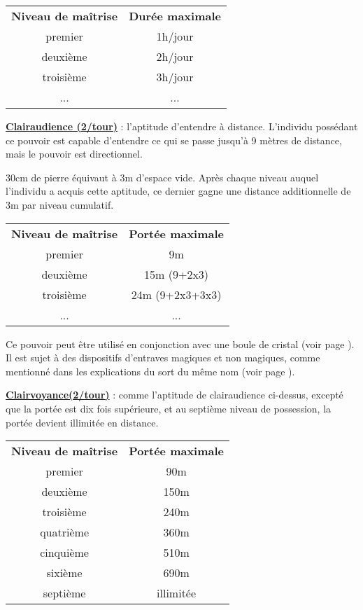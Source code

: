 \bigskip

\begin{tabular}{cc}
\textbf{Niveau de maîtrise} & \textbf{Durée maximale} \\
premier     & 1h/jour \\
deuxième    & 2h/jour \\
troisième   & 3h/jour \\
...         & ... \\
\end{tabular}

\bigskip

\label{guerrier-clairaudience}\textbf{\uline{Clairaudience (2/tour)}} : l'aptitude d'entendre à distance. L'individu possédant ce pouvoir est capable d'entendre ce qui se passe jusqu'à 9 mètres de distance, mais le pouvoir est directionnel.

\bigskip

30cm de pierre équivaut à 3m d'espace vide. Après chaque niveau auquel l'individu a acquis cette aptitude, ce dernier gagne une distance additionnelle de 3m par niveau cumulatif.

\bigskip

\begin{tabular}{cc}
\textbf{Niveau de maîtrise} & \textbf{Portée maximale} \\
premier     & 9m \\
deuxième    & 15m (9+2x3) \\
troisième   & 24m (9+2x3+3x3) \\
...         & ... \\
\end{tabular}

\bigskip

Ce pouvoir peut être utilisé en conjonction avec une boule de cristal (voir page \pageref{objet-boule-cristal}). Il est sujet à des dispositifs d'entraves magiques et non magiques, comme mentionné dans les explications du sort du même nom (voir page \pageref{sort-clairaudience}).

\newpage

\label{guerrier-clairvoyance}\textbf{\uline{Clairvoyance(2/tour)}} : comme l'aptitude de clairaudience ci-dessus, excepté que la portée est dix fois supérieure, et au septième niveau de possession, la portée devient illimitée en distance.

\bigskip
\begin{tabular}{cc}
\textbf{Niveau de maîtrise} & \textbf{Portée maximale} \\
premier     & 90m \\
deuxième    & 150m \\
troisième   & 240m \\
quatrième   & 360m \\
cinquième   & 510m \\
sixième     & 690m \\
septième    & illimitée \\
\end{tabular}

